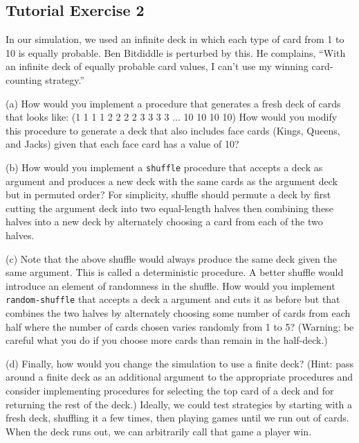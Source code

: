 \subsection{Tutorial Exercise 2}

In our simulation, we used an infinite deck in which each type of card
from 1 to 10 is equally probable.  Ben Bitdiddle is perturbed by this.
He complains, ``With an infinite deck of equally probable card values,
I can't use my winning card-counting strategy.''

(a) How would you implement a procedure that generates a fresh deck of
cards that looks like:
\beginlisp
(1 1 1 1 2 2 2 2 3 3 3 3 ... 10 10 10 10)
\endlisp
How would you modify this procedure to generate a deck that also
includes face cards (Kings, Queens, and Jacks) given that each face
card has a value of 10?

(b) How would you implement a {\tt shuffle} procedure that accepts a
deck as argument and produces a new deck with the same cards as the
argument deck but in permuted order?  For simplicity, shuffle should
permute a deck by first cutting the argument deck into two
equal-length halves then combining these halves into a new deck by
alternately choosing a card from each of the two halves.

(c) Note that the above shuffle would always produce the same deck
given the same argument.  This is called a deterministic procedure.  A
better shuffle would introduce an element of randomness in the
shuffle.  How would you implement {\tt random-shuffle} that accepts a
deck a argument and cuts it as before but that combines the two halves
by alternately choosing some number of cards from each half where the
number of cards chosen varies randomly from 1 to 5?  (Warning: be
careful what you do if you choose more cards than remain in the
half-deck.)

(d)  Finally, how would you change the simulation to use a finite deck?
(Hint: pass around a finite deck as an additional argument to the
appropriate procedures and consider implementing procedures for
selecting the top card of a deck and for returning the rest of the
deck.) Ideally, we could test strategies by starting with a fresh
deck, shuffling it a few times, then playing games until we run out of
cards. When the deck runs out, we can arbitrarily call that game a
player win.




